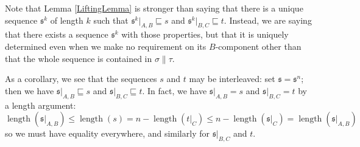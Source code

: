 \documentclass[11pt]{article} %
\theoremstyle{plain} %
\theoremstyle{definition} %
\theoremstyle{note}
\theoremstyle{exercisestyle}
\newcommand{\s}{\mathfrak s}
\newcommand{\prefix}{\sqsubseteq}
\DeclareMathOperator{\length}{length}
\begin{document}
Note that Lemma \ref{LiftingLemma} is stronger than saying that there is a unique sequence $\s^k$ of length $k$ such that $\s^k\vert_{A,B}\prefix s$ and $\s^k\vert_{B,C}\prefix t$.  Instead, we are saying that there exists a sequence $\s^k$ with those properties, but that it is uniquely determined even when we make no requirement on its $B$-component other than that the whole sequence is contained in $\sigma\|\tau$.

As a corollary, we see that the sequences $s$ and $t$ may be interleaved: set $\s=\s^n$; then we have $\s\vert_{A,B}\prefix s$ and $\s\vert_{B,C}\prefix t$.  In fact, we have $\s\vert_{A,B}=s$ and $\s\vert_{B,C}=t$ by a length argument:
\[
  \length(\s\vert_{A,B})\le\length(s)=n-\length(t\vert_C)\le n-\length(\s\vert_C)=\length(\s\vert_{A,B})
  \]
so we must have equality everywhere, and similarly for $\s\vert_{B,C}$ and $t$.
\end{document}
